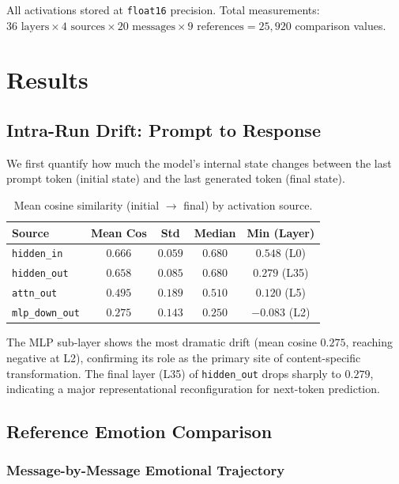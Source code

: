\documentclass[11pt,a4paper]{article}
\begin{document}
All activations stored at \texttt{float16} precision. Total measurements: $36 \text{ layers} \times 4 \text{ sources} \times 20 \text{ messages} \times 9 \text{ references} = 25{,}920$ comparison values.

\section{Results}

\subsection{Intra-Run Drift: Prompt to Response}

We first quantify how much the model's internal state changes between the last prompt token (initial state) and the last generated token (final state).

\begin{table}[H]
\centering
\caption{Mean cosine similarity (initial $\to$ final) by activation source.}
\label{tab:intra}
\small
\begin{tabular}{@{}lcccc@{}}
\toprule
Source & Mean Cos & Std & Median & Min (Layer) \\
\midrule
\texttt{hidden\_in} & $0.666$ & $0.059$ & $0.680$ & $0.548$ (L0) \\
\texttt{hidden\_out} & $0.658$ & $0.085$ & $0.680$ & $0.279$ (L35) \\
\texttt{attn\_out} & $0.495$ & $0.189$ & $0.510$ & $0.120$ (L5) \\
\texttt{mlp\_down\_out} & $0.275$ & $0.143$ & $0.250$ & $-0.083$ (L2) \\
\bottomrule
\end{tabular}
\end{table}

The MLP sub-layer shows the most dramatic drift (mean cosine $0.275$, reaching negative at L2), confirming its role as the primary site of content-specific transformation. The final layer (L35) of \texttt{hidden\_out} drops sharply to $0.279$, indicating a major representational reconfiguration for next-token prediction.

\subsection{Reference Emotion Comparison}

\subsubsection{Message-by-Message Emotional Trajectory}
\end{document}
